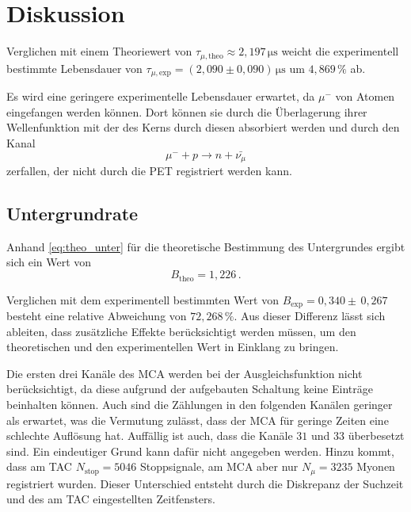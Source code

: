 \section{Diskussion}
\label{sec:Diskussion}


Verglichen mit einem Theoriewert von $\tau_{\mu,\text{theo}} \approx 2,197 \,\unit{\micro\second}$ \cite{pdg} weicht die experimentell bestimmte Lebensdauer von
$\tau_{\mu,\text{exp}} =  \left(2,090  \pm 0,090 \right) \,\unit{\micro\second}$ um $4,869 \,\%$  ab.

Es wird eine geringere experimentelle Lebensdauer erwartet, da $\mu^{-}$ von Atomen eingefangen werden können. 
Dort können sie durch die Überlagerung ihrer Wellenfunktion mit der des Kerns durch diesen absorbiert werden und durch den Kanal
\begin{equation*}
    \mu^{-} +  p \rightarrow  n + \bar{{\nu}_\mu}
\end{equation*}
zerfallen, der nicht durch die PET registriert werden kann.

\subsection{Untergrundrate}

Anhand \eqref{eq:theo_unter} für die theoretische Bestimmung des Untergrundes ergibt sich ein Wert von
\begin{equation*}
    B_\text{theo} = 1,226 \,.
\end{equation*}

Verglichen mit dem experimentell bestimmten Wert von $B_\text{exp} = 0,340 \pm \, 0,267$ besteht eine relative Abweichung von
$72,268 \,\%$. Aus dieser Differenz lässt sich ableiten, dass zusätzliche Effekte berücksichtigt werden müssen, um den theoretischen und den experimentellen Wert in Einklang zu bringen.

Die ersten drei Kanäle des MCA werden bei der Ausgleichsfunktion nicht berücksichtigt, da diese aufgrund der aufgebauten Schaltung keine Einträge beinhalten können.
Auch sind die Zählungen in den folgenden Kanälen geringer als erwartet, was die Vermutung zulässt, dass der MCA für geringe Zeiten eine schlechte Auflösung hat.
Auffällig ist auch, dass die Kanäle $31$ und $33$ überbesetzt sind. Ein eindeutiger Grund kann dafür nicht angegeben werden.
Hinzu kommt, dass am TAC $N_\text{stop} = 5046$ Stoppsignale, am MCA aber nur $N_{\mu} = 3235$ Myonen registriert wurden.
Dieser Unterschied entsteht durch die Diskrepanz der Suchzeit und des am TAC eingestellten Zeitfensters.



